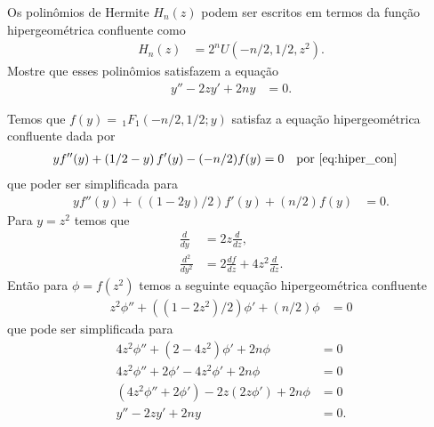 \documentclass[a4paper,10pt, leqno, answers]{exam}  %
\begin{document}
\begin{questions}
     Os polinômios de Hermite $H_n(z)$ podem ser escritos em termos da fun\c{c}\~{a}o hipergeom\'{e}trica confluente como
    \begin{align*}
        H_n(z) &= 2^n U(-n/2, 1/2, z^2).
    \end{align*}
    Mostre que esses polin\^{o}mios satisfazem a equa\c{c}\~{a}o
    \begin{align*}
        y'' - 2 zy' + 2ny &= 0.
    \end{align*}
    \begin{solution}
        Temos que $f(y) = \,_1F_1(-n/2, 1/2; y)$ satisfaz a equa\c{c}\~{a}o hipergeom\'{e}trica confluente dada por
        \begin{align*}
            y f''(y) + \left( 1/2 - y \right) f'(y) - (-n/2) f(y) &= 0 && \text{por \eqref{eq:hiper_con}}
        \end{align*}
        que poder ser simplificada para
        \begin{align*}
            y f''(y) + \left( (1 - 2y) / 2 \right) f'(y) + (n/2) f(y) &= 0.
        \end{align*}
        Para $y = z^2$ temos que
        \begin{align*}
            \frac{d}{dy} &= 2 z \frac{d}{dz}, \\
            \frac{d^2}{dy^2} &= 2 \frac{df}{dz} + 4 z^2 \frac{d}{dz}.
        \end{align*}
        Ent\~{a}o para $\phi = f(z^2)$ temos a seguinte equa\c{c}\~{a}o hipergeom\'{e}trica confluente
        \begin{align*}
            z^2 \phi'' + \left( (1 - 2z^2)/2 \right) \phi' + (n/2) \phi &= 0
        \end{align*}
        que pode ser simplificada para
        \begin{align*}
            4 z^2 \phi'' + \left( 2 - 4z^2 \right) \phi' + 2n \phi &= 0 \\
            4 z^2 \phi'' + 2 \phi' - 4z^2 \phi' + 2n \phi &= 0 \\
            ( 4 z^2 \phi'' + 2 \phi') - 2 z (2 z \phi') + 2n \phi &= 0 \\
            y'' - 2 z y' + 2n y &= 0.
        \end{align*}
    \end{solution}


\end{questions}
\end{document}
